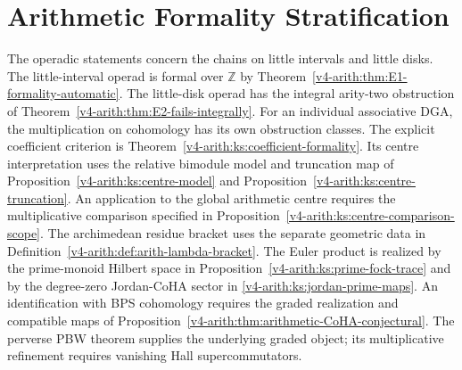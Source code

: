 

\section{Arithmetic Formality Stratification}
\label{v4-arith:ks:stratification}

The operadic statements concern the chains on little intervals and little disks.
The little-interval operad is formal over $\mathbb Z$ by
Theorem~\ref{v4-arith:thm:E1-formality-automatic}.
The little-disk operad has the integral arity-two obstruction of
Theorem~\ref{v4-arith:thm:E2-fails-integrally}.
For an individual associative DGA, the multiplication on cohomology has
its own obstruction classes.
The explicit coefficient criterion is
Theorem~\ref{v4-arith:ks:coefficient-formality}.
Its centre interpretation uses the relative bimodule model and truncation map
of Proposition~\ref{v4-arith:ks:centre-model} and Proposition~\ref{v4-arith:ks:centre-truncation}.
An application to the global arithmetic centre requires the multiplicative
comparison specified in Proposition~\ref{v4-arith:ks:centre-comparison-scope}.
The archimedean residue bracket uses the separate geometric data in
Definition~\ref{v4-arith:def:arith-lambda-bracket}.
The Euler product is realized by the prime-monoid Hilbert space in
Proposition~\ref{v4-arith:ks:prime-fock-trace} and by the degree-zero
Jordan-CoHA sector in \eqref{v4-arith:ks:jordan-prime-maps}.
An identification with BPS cohomology requires the graded realization
and compatible maps of Proposition~\ref{v4-arith:thm:arithmetic-CoHA-conjectural}.
The perverse PBW theorem supplies the underlying graded object;
its multiplicative refinement requires vanishing Hall supercommutators.
